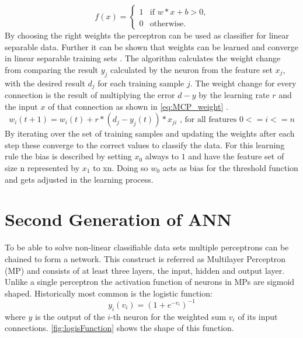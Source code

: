 \begin{equation}\label{eq:MCP}
  f(x) =
    \begin{cases}
      1 & \text{if $w*x+b > 0$,} \\
      0 & \text{otherwise.}
    \end{cases}  
\end{equation}
By choosing the right weights the perceptron can be used as classifier for linear separable data. Further it can be shown that weights can be learned and converge in linear separable training sets \cite{Bishop:998831}. The algorithm calculates the weight change from comparing the result $y_j$ calculated by the neuron from the feature set $x_j$, with the desired result $d_j$ for each training sample $j$. The weight change for every connection is the result of multiplying the error $d-y$ by the learning rate $r$ and the input $x$ of that connection as shown in \autoref{eq:MCP_weight} .
\newline
\begin{equation}\label{eq:MCP_weight}
  w_i(t+1) = w_i(t) +r * (d_j - y_j(t))*x_{ji} \text{ , for all features $0<=i<=n$}
\end{equation}
By iterating over the set of training samples and updating the weights after each step these converge to the correct values to classify the data.
\newline
For this learning rule the bias is described by setting $x_0$ always to $1$ and have the feature set of size n represented by $x_1$ to xn. Doing so $w_0$ acts as bias for the threshold function and gets adjusted in the learning process.

\section{Second Generation of ANN}\label{sec:backprop}
To be able to solve non-linear classifiable data sets multiple perceptrons can be chained to form a network. This construct is referred as Multilayer Perceptron (MP) and consists of at least three layers, the input, hidden and output layer. Unlike a single perceptron the activation function of neurons in MPs are sigmoid shaped. Historically most common is the logistic function:
\begin{equation}\label{eq:logisFunc}
  y_i(v_i) = (1 + e^{-v_i})^{-1}
\end{equation}
where $y$ is the output of the $i$-th neuron for the weighted sum $v_i$ of its input connections.
\autoref{fig:logisFunction} shows the shape of this function.


